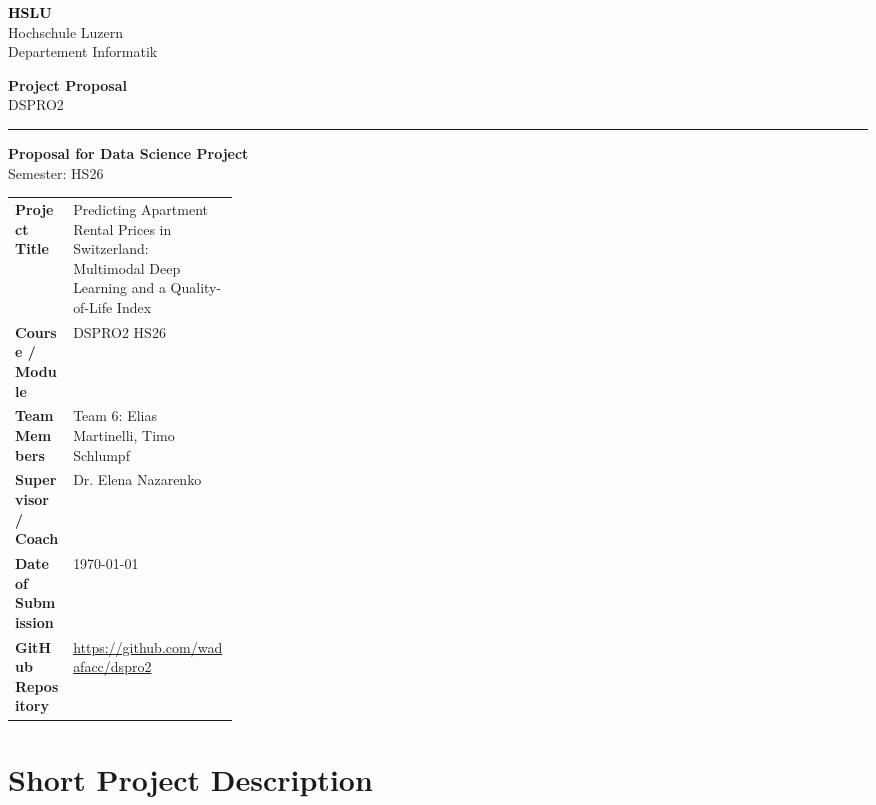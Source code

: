 \documentclass[11pt,a4paper]{article}
\newcommand{\hsluwordmark}{%
  {\fontsize{22}{24}\selectfont\bfseries\textcolor{black}{HSLU}}%
}
\newcommand{\proposaltype}{%
  {\fontsize{13}{15}\selectfont\bfseries Project Proposal}
}
\newcommand{\moduleline}{%
  {\fontsize{11}{13}\selectfont DSPRO2}
}
\begin{document}
\begin{minipage}[t]{0.62\textwidth}
    \hsluwordmark\\[-1mm]
    {\small\color{hsluGray}Hochschule Luzern}\\[-0.5mm]
    {\small\color{hsluGray}Departement Informatik}
\end{minipage}
\hfill
\begin{minipage}[t]{0.35\textwidth}
    \raggedleft
    \proposaltype\\[1mm]
    \moduleline
\end{minipage}

\vspace{8mm}
{\color{hsluGray}\rule{\textwidth}{1.2pt}}

\vspace{8mm}

\begin{center}
    {\LARGE\bfseries\color{hsluDark}Proposal for Data Science Project}\\[1mm]
    {\large\color{hsluGray}Semester: HS26}
\end{center}

\vspace{8mm}

\colorbox{boxGray}{%
\parbox{\dimexpr\linewidth-2\fboxsep\relax}{
\vspace{1mm}
\renewcommand{\arraystretch}{1.35}
\begin{tabularx}{\linewidth}{>{\bfseries}p{0.26\linewidth} X}
Project Title & Predicting Apartment Rental Prices in Switzerland: Multimodal Deep Learning and a Quality-of-Life Index \\
Course / Module & DSPRO2 HS26 \\
Team Members & Team 6: Elias Martinelli, Timo Schlumpf \\
Supervisor / Coach & Dr. Elena Nazarenko \\
Date of Submission & \today \\
GitHub Repository & \url{https://github.com/wadafacc/dspro2} \\
\end{tabularx}
\vspace{1mm}
}
}

\vspace{1em}

\section{Short Project Description}
\end{document}
